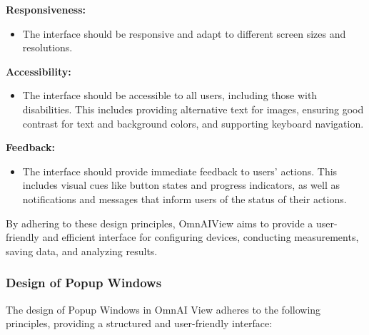 \documentclass[]{scrreprt}
\begin{document}
\textbf{Responsiveness:}
\begin{itemize}
    \item The interface should be responsive and adapt to different screen sizes and resolutions. 
\end{itemize}

\textbf{Accessibility:}
    \begin{itemize}
        \item The interface should be accessible to all users, including those with disabilities. This includes providing alternative text for images, ensuring good contrast for text and background colors, and supporting keyboard navigation.
    \end{itemize}
    
\textbf{Feedback:}
    \begin{itemize}
        \item The interface should provide immediate feedback to users' actions. This includes visual cues like button states and progress indicators, as well as notifications and messages that inform users of the status of their actions.
    \end{itemize}
    
By adhering to these design principles, OmnAIView aims to provide a user-friendly and efficient interface for configuring devices, conducting measurements, saving data, and analyzing results.
    
\subsubsection{Design of Popup Windows}\label{cap:Designprinciples_Popupwindows}

The design of Popup Windows in OmnAI View adheres to the following principles, providing a structured and user-friendly interface:
\end{document}
